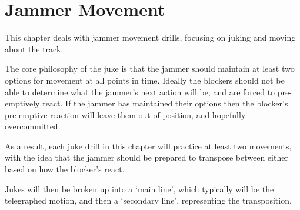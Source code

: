 \chapter{Jammer Movement}

This chapter deals with jammer movement drills, focusing on juking and moving about the track. 


The core philosophy of the juke is that the jammer should maintain at least two options for movement at all points in time.  
Ideally the blockers should not be able to determine what the jammer's next action will be, and are forced to pre-emptively react.    
If the jammer has maintained their options then the blocker's pre-emptive reaction will leave them out of position, and hopefully overcommitted.  


As a result, each juke drill in this chapter will practice at least two movements, with the idea that the jammer should be prepared to transpose between either based on how the blocker's react.

Jukes will then be broken up into a `main line', which typically will be the telegraphed motion, and then a `secondary line', representing the transposition.    
